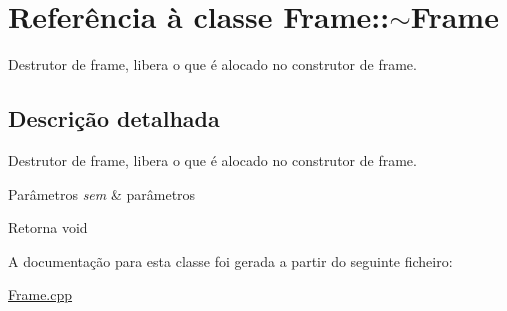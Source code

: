 \hypertarget{class_frame_1_1~_frame}{}\section{Referência à classe Frame\+:\+:$\sim$\+Frame}
\label{class_frame_1_1~_frame}


Destrutor de frame, libera o que é alocado no construtor de frame.  




\subsection{Descrição detalhada}
Destrutor de frame, libera o que é alocado no construtor de frame. 


\begin{DoxyParams}{Parâmetros}
{\em sem} & parâmetros \\
\hline
\end{DoxyParams}
\begin{DoxyReturn}{Retorna}
void 
\end{DoxyReturn}


A documentação para esta classe foi gerada a partir do seguinte ficheiro\+:\begin{DoxyCompactItemize}
\item 
\hyperlink{_frame_8cpp}{Frame.\+cpp}\end{DoxyCompactItemize}
